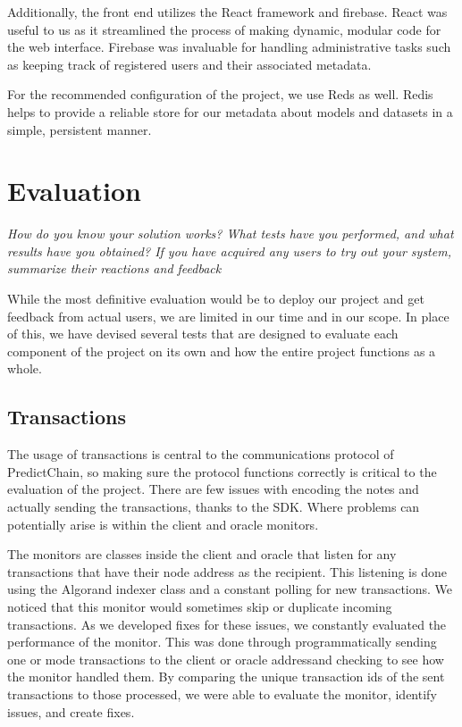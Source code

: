 \documentclass{article}
\begin{document}
    Additionally, the front end utilizes the React framework and firebase.  React was useful to us as it streamlined the process of making
    dynamic, modular code for the web interface.  Firebase was invaluable for handling administrative tasks such as keeping
    track of registered users and their associated metadata.

    For the recommended configuration of the project, we use Reds as well.  Redis helps to provide a reliable store for
    our metadata about models and datasets in a simple, persistent manner.

    \section{Evaluation}

    \emph{How do you know your solution works? What tests have you performed, and what results have you obtained?
    If you have acquired any users to try out your system, summarize their reactions and feedback}

    While the most definitive evaluation would be to deploy our project and get feedback from actual users, we are limited
    in our time and in our scope.  In place of this, we have devised several tests that are designed to evaluate each
    component of the project on its own and how the entire project functions as a whole.

    \subsection{Transactions}

    The usage of transactions is central to the communications protocol of PredictChain, so making sure the protocol
    functions correctly is critical to the evaluation of the project.  There are few issues with encoding the
    notes and actually sending the transactions, thanks to the SDK.  Where problems can potentially arise is within the
    client and oracle monitors.

    The monitors are classes inside the client and oracle that listen for any transactions that have their node address
    as the recipient.  This listening is done using the Algorand indexer class and a constant polling for new transactions.
    We noticed that this monitor would sometimes skip or duplicate incoming transactions.  As we developed fixes for
    these issues, we constantly evaluated the performance of the monitor.  This was done through programmatically sending
    one or mode transactions to the client or oracle addressand checking to see how the monitor handled them.  By comparing
    the unique transaction ids of the sent transactions to those processed, we were able to evaluate the monitor,
    identify issues, and create fixes.
\end{document}
